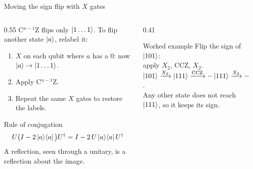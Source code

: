 \documentclass[aspectratio=169,11pt]{beamer}
\newcommand{\pj}[1]{\ket{#1}\!\bra{#1}}
\begin{document}
\begin{frame}{Moving the sign flip with $X$ gates}
  \begin{columns}[T]
    \begin{column}{0.55\textwidth}
      C$^{n-1}$Z flips only $\ket{1\dots1}$. To flip another state $\ket{a}$, relabel it:
      \begin{enumerate}
        \item $X$ on each qubit where $a$ has a $0$: now $\ket{a} \to \ket{1\dots1}$.
        \item Apply C$^{n-1}$Z.
        \item Repeat the same $X$ gates to restore the labels.
      \end{enumerate}
      \begin{block}{Rule of conjugation}
        \[ U\big(I - 2\pj{a}\big)U^\dagger = I - 2\,U\pj{a}U^\dagger \]
        A reflection, seen through a unitary, is a reflection about the image.
      \end{block}
    \end{column}
    \begin{column}{0.41\textwidth}
      \begin{exampleblock}{Worked example}
        Flip the sign of $\ket{101}$:\\[1mm]
        apply $X_2$, CCZ, $X_2$.\\[1mm]
        $\ket{101} \xrightarrow{X_2} \ket{111} \xrightarrow{\mathrm{CCZ}} -\ket{111} \xrightarrow{X_2} -\ket{101}$.\\[1mm]
        Any other state does not reach $\ket{111}$, so it keeps its sign.
      \end{exampleblock}
    \end{column}
  \end{columns}
\end{frame}
\end{document}
